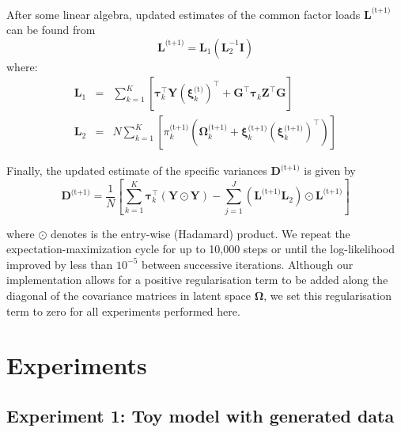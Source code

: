 \documentclass[twocolumn]{aastex62}
\newcommand{\vect}[1]{\boldsymbol{\mathbf{#1}}}
\renewcommand{\vec}[1]{\vect{#1}}
\newcommand{\weight}{\pi}
\newcommand{\data}{\textbf{Y}}
\newcommand{\vecdata}{\vec\data}
\newcommand{\nextstep}{^\textrm{(t+1)}}
\newcommand{\thisstep}{^\textrm{(t)}}
\newcommand{\transpose}{^\intercal}
\newcommand{\eye}{\textbf{I}}
\newcommand{\factorloads}{\textbf{L}}
\newcommand{\specificvariance}{\vec{D}}
\newcommand{\scoremeans}{\vec\xi}
\newcommand{\scorecovs}{\vec\Omega}
\newcommand{\NumData}{N}
\newcommand{\NumComponents}{K}
\newcommand{\numcomponents}{k}
\begin{document}
After some linear algebra, updated estimates of the common factor loads $\factorloads\nextstep$
can be found from
\begin{equation}
	\factorloads\nextstep = \factorloads_{1}\left(\factorloads_{2}^{-1}\eye\right)
\end{equation}
\noindent{}where:
\begin{eqnarray}
	\factorloads_1 &=& \sum_{\numcomponents=1}^{\NumComponents}\left[ \vec\tau_\numcomponents\transpose\vecdata\left(\scoremeans_\numcomponents\thisstep\right)\transpose + 
	\vec{G}\transpose\vec\tau_\numcomponents\vec{Z}\transpose\vec{G}\right] \\
	\factorloads_2 &=& N\sum_{\numcomponents=1}^{\NumComponents}\left[\weight_\numcomponents\nextstep\left(\scorecovs_\numcomponents\nextstep + \scoremeans_\numcomponents\nextstep\left(\scoremeans_\numcomponents\nextstep\right)\transpose\right)\right]
\end{eqnarray}


Finally, the updated estimate of the specific variances $\specificvariance\nextstep$ is given
by
\begin{equation}
	\specificvariance\nextstep = \frac{1}{\NumData}\left[\sum^{\NumComponents}_{\numcomponents=1}\vec\tau_\numcomponents\transpose\left(\vecdata\odot\vecdata\right) - \sum_{j=1}^{J}\left(\factorloads\nextstep\factorloads_2\right)\odot\factorloads\nextstep\right]
\end{equation}

\noindent{}where $\odot$ denotes is the entry-wise (Hadamard) product. We repeat
the expectation-maximization cycle for up to 10,000 steps or until the log-likelihood
improved by less than $10^{-5}$ between successive iterations. Although our implementation
allows for a positive regularisation term to be added along the diagonal of the covariance
matrices in latent space $\scorecovs$, we set this regularisation term to zero for all
experiments performed here.


\section{Experiments} \label{sec:experiments}


\subsection{Experiment 1: Toy model with generated data} \label{sec:experiment-toy-model}
\end{document}
